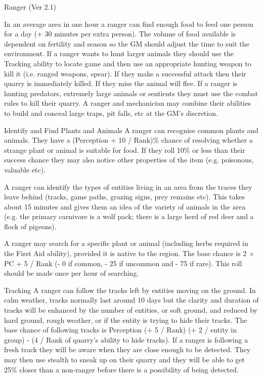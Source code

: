 \begin{Chapter}{Ranger (Ver 2.1)}
\begin{Description}
  In an average area in one hour a ranger can find enough food to feed
  one person for a day (+ 30 minutes per extra person).  The volume of
  food available is dependent on fertility and season so the GM should
  adjust the time to suit the environment.  If a ranger wants to hunt
  larger animals they should use the Tracking ability to locate game
  and then use an appropriate hunting weapon to kill it (i.e.  ranged
  weapons, spear).  If they make a successful attack then their quarry
  is immediately killed.  If they miss the animal will flee.  If a
  ranger is hunting predators, extremely large animals or sentients
  they must use the combat rules to kill their quarry.  A ranger and
  mechanician may combine their abilities to build and conceal large
  traps, pit falls, etc at the GM’s discretion.

\item[Identify and Find Plants and Animals] A ranger can recognise
  common plants and animals.  They have a (Perception + 10 / Rank)\%
  chance of resolving whether a strange plant or animal is suitable
  for food.  If they roll 10\% or less than their success chance they
  may also notice other properties of the item (e.g. poisonous,
  valuable etc).

  A ranger can identify the types of entities living in an area from
  the traces they leave behind (tracks, game paths, grazing signs,
  prey remains etc).  This takes about 15 minutes and gives them an
  idea of the variety of animals in the area (e.g. the primary
  carnivore is a wolf pack; there is a large herd of red deer and a
  flock of pigeons).

  A ranger may search for a specific plant or animal (including herbs
  required in the First Aid ability), provided it is native to the
  region. The base chance is 2 × PC + 5 / Rank (- 0 if common, - 25 if
  uncommon and - 75 if rare). This roll should be made once per hour
  of searching.

\item[Tracking] A ranger can follow the tracks left by entities moving
  on the ground.  In calm weather, tracks normally last around 10 days
  but the clarity and duration of tracks will be enhanced by the
  number of entities, or soft ground, and reduced by hard ground,
  rough weather, or if the entity is trying to hide their tracks.  The
  base chance of following tracks is Perception (+ 5 / Rank) (+ 2 /
  entity in group) - (4 / Rank of quarry’s ability to hide tracks).
  If a ranger is following a fresh track they will be aware when they
  are close enough to be detected.  They may then use stealth to sneak
  up on their quarry and they will be able to get 25\% closer than a
  non-ranger before there is a possibility of being detected.


\end{Description}
\end{Chapter}
